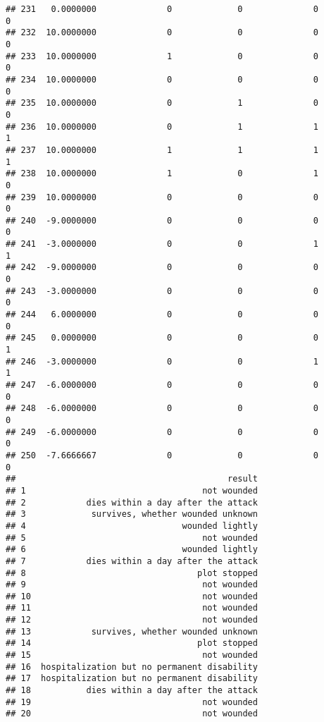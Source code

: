 \documentclass[
]{article}
\begin{document}
\begin{verbatim}
## 231   0.0000000              0             0              0             0
## 232  10.0000000              0             0              0             0
## 233  10.0000000              1             0              0             0
## 234  10.0000000              0             0              0             0
## 235  10.0000000              0             1              0             0
## 236  10.0000000              0             1              1             1
## 237  10.0000000              1             1              1             1
## 238  10.0000000              1             0              1             0
## 239  10.0000000              0             0              0             0
## 240  -9.0000000              0             0              0             0
## 241  -3.0000000              0             0              1             1
## 242  -9.0000000              0             0              0             0
## 243  -3.0000000              0             0              0             0
## 244   6.0000000              0             0              0             0
## 245   0.0000000              0             0              0             1
## 246  -3.0000000              0             0              1             1
## 247  -6.0000000              0             0              0             0
## 248  -6.0000000              0             0              0             0
## 249  -6.0000000              0             0              0             0
## 250  -7.6666667              0             0              0             0
##                                          result
## 1                                   not wounded
## 2            dies within a day after the attack
## 3             survives, whether wounded unknown
## 4                               wounded lightly
## 5                                   not wounded
## 6                               wounded lightly
## 7            dies within a day after the attack
## 8                                  plot stopped
## 9                                   not wounded
## 10                                  not wounded
## 11                                  not wounded
## 12                                  not wounded
## 13            survives, whether wounded unknown
## 14                                 plot stopped
## 15                                  not wounded
## 16  hospitalization but no permanent disability
## 17  hospitalization but no permanent disability
## 18           dies within a day after the attack
## 19                                  not wounded
## 20                                  not wounded

\end{verbatim}
\end{document}
